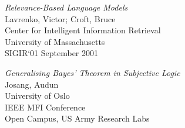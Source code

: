 \documentclass{article}
\newcommand{\bibtitle}[1]{{\it #1}}
\begin{document}
\begin{thebibliography}{99}
        \bibtitle{Relevance-Based Language Models}\\
        Lavrenko, Victor; Croft, Bruce\\
        Center for Intelligent Information Retrieval\\
        University of Massachusetts \\
        SIGIR`01 September 2001

        \bibtitle{Generalising Bayes' Theorem in Subjective Logic}\\
        Josang, Audun\\
        University of Oslo\\
        IEEE MFI Conference\\
        Open Campus, US Army Research Labs


\end{thebibliography}
\end{document}
